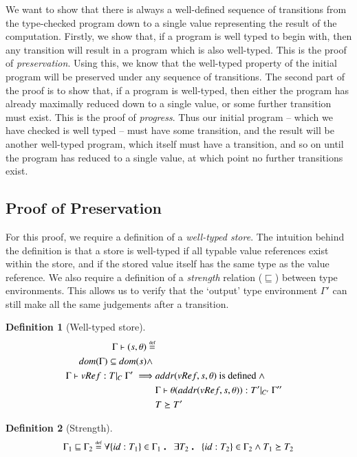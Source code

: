 \documentclass[12pt,a4paper,twoside,openright]{report}
\theoremstyle{definition}
\newtheorem{definition}{Definition}[section]
\theoremstyle{dotless}
\newcommand\eqdef{\mathrel{\overset{\makebox[0pt]{\mbox{\normalfont\tiny def}}}{=}}}
\newcommand\qdot{\mathbin{\scalebox{1.5}{.}}\enspace}
\begin{document}
We want to show that there is always a well-defined sequence of transitions
from the type-checked program down to a single value
representing the result of the computation. Firstly, we show that, if a program
is well typed to begin with, then any transition will result in a program which
is also well-typed. This is the proof of \textit{preservation}.  Using this, we
know that the well-typed property of the initial program will be preserved
under any sequence of transitions. The second part of the proof is to show
that, if a program is well-typed, then either the program has already maximally
reduced down to a single value, or some further transition must exist. This is
the proof of \textit{progress}. Thus our initial program -- which we have
checked is well typed -- must have some transition, and the result will be
another well-typed program, which itself must have a transition, and so on
until the program has reduced to a single value, at which point no further
transitions exist.

\subsection{Proof of Preservation}

For this proof, we require a definition of a \textit{well-typed store}.  The
intuition behind the definition is that a store is well-typed if all typable
value references exist within the store, and if the stored value
itself has the same type as the value reference. We also require a definition
of a \textit{strength} relation ($\sqsubseteq$) between type environments. This
 allows us to verify that the `output' type environment $\Gamma'$ 
can still make all the same judgements after a transition.

\begin{definition}[Well-typed store]
  \begin{equation} \label{eqn:typed-store}
  	\begin{split}
  	\Gamma\vdash(s,\theta)\eqdef \\
  	  dom(\Gamma) \subseteq dom(s) \land\ & \\
  	  \Gamma \vdash vRef:T|_C\ \Gamma' \implies & addr(vRef,s, \theta)\textrm{ is defined}\ \land \\
  	  & \Gamma\vdash\theta(addr(vRef,s,\theta)):T'|_{C'}\ \Gamma'' \\
	  & T\succeq T'
  	\end{split}
  \end{equation}
\end{definition}
\begin{definition}[Strength]
  \begin{equation} \label{eqn:strength}
	\Gamma_1 \sqsubseteq \Gamma_2 \eqdef 
	\forall\{id:T_1\}\in\Gamma_1 \qdot \exists T_2 \qdot \{id:T_2\}\in\Gamma_2 \land T_1\succeq T_2
  \end{equation}
\end{definition}
\end{document}
